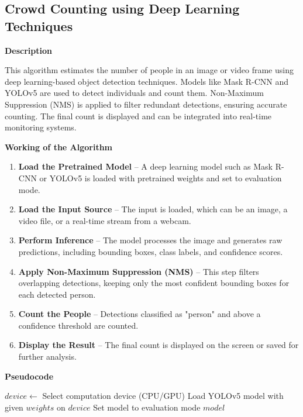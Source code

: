 \documentclass[11pt]{report}
\begin{document}
\subsection{Crowd Counting using Deep Learning Techniques}

\textbf{Description}  

This algorithm estimates the number of people in an image or video frame using deep learning-based object detection techniques. Models like Mask R-CNN and YOLOv5 are used to detect individuals and count them. Non-Maximum Suppression (NMS) is applied to filter redundant detections, ensuring accurate counting. The final count is displayed and can be integrated into real-time monitoring systems.

\textbf{Working of the Algorithm}  

\begin{enumerate}
    \item \textbf{Load the Pretrained Model} – A deep learning model such as Mask R-CNN or YOLOv5 is loaded with pretrained weights and set to evaluation mode.
    \item \textbf{Load the Input Source} – The input is loaded, which can be an image, a video file, or a real-time stream from a webcam.
    \item \textbf{Perform Inference} – The model processes the image and generates raw predictions, including bounding boxes, class labels, and confidence scores.
    \item \textbf{Apply Non-Maximum Suppression (NMS)} – This step filters overlapping detections, keeping only the most confident bounding boxes for each detected person.
    \item \textbf{Count the People} – Detections classified as "person" and above a confidence threshold are counted.
    \item \textbf{Display the Result} – The final count is displayed on the screen or saved for further analysis.
\end{enumerate}  

\textbf{Pseudocode}  

\begin{algorithm}[H]
\caption{Load Pretrained Model}
\begin{algorithmic}[1]
    \State $device \gets$ Select computation device (CPU/GPU)
    \State Load YOLOv5 model with given $weights$ on $device$
    \State Set model to evaluation mode
    \State \Return $model$
\EndFunction
\end{algorithmic}
\end{algorithm}
\end{document}
